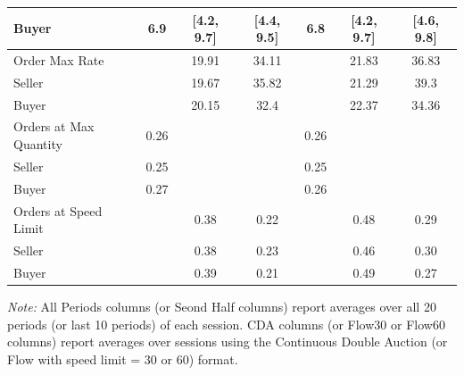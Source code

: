 \documentclass[12pt]{article}
\begin{document}
\begin{table}[t]
{\begin{threeparttable}
\begin{tabular}{lcccccc}
    \hspace{3mm}Buyer               & 6.9      & [4.2, 9.7]  & [4.4, 9.5]  & 6.8      & [4.2, 9.7]  & [4.6, 9.8]  \\
   \hline
     Order Max Rate                 &          & 19.91         & 34.11         &           & 21.83         & 36.83         \\
    \hspace{3mm}Seller              &          & 19.67         & 35.82         &           & 21.29         & 39.3          \\
    \hspace{3mm}Buyer               &          & 20.15         & 32.4          &           & 22.37         & 34.36         \\
   \hline
    Orders at Max Quantity          & 0.26     &               &               & 0.26      &               &               \\
    \hspace{3mm}Seller              & 0.25     &               &               & 0.25      &               &               \\
    \hspace{3mm}Buyer               & 0.27     &               &               & 0.26      &               &               \\
   \hline
    Orders at Speed Limit      &          & 0.38          & 0.22          &           & 0.48          & 0.29          \\
    \hspace{3mm}Seller              &          & 0.38          & 0.23          &           & 0.46          & 0.30           \\
    \hspace{3mm}Buyer               &          & 0.39          & 0.21          &           & 0.49          & 0.27          \\
    \bottomrule
    \end{tabular}
\begin{tablenotes}
\footnotesize
\textit{Note:} 
All Periods columns (or Seond Half columns) report averages over all 20 periods (or last 10 periods) of each session. 
CDA columns (or Flow30 or Flow60 columns) report averages over sessions using the Continuous Double Auction (or Flow with speed limit = 30 or 60) format. 

\end{tablenotes}
\end{threeparttable}}
\end{table}
\end{document}
